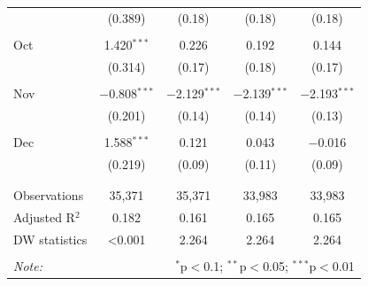 \documentclass[titlepage, 11pt]{article}
\begin{document}
\begin{table}[!htbp]
{\begin{tabular}{@{\extracolsep{5pt}}lcccc}
  & (0.389) & (0.18) & (0.18) & (0.18) \\ 
  & & & & \\ 
 Oct & 1.420$^{***}$ & 0.226 & 0.192  &0.144 \\ 
  & (0.314) & (0.17) & (0.18) & (0.17) \\ 
  & & & & \\ 
 Nov & $-$0.808$^{***}$ & $-$2.129$^{***}$ & $-$2.139$^{***}$ & $-$2.193$^{***}$ \\ 
  & (0.201) & (0.14) & (0.14) & (0.13) \\ 
  & & & & \\ 
 Dec & 1.588$^{***}$ & 0.121 & 0.043 & $-$0.016 \\ 
  & (0.219) & (0.09) & (0.11) & (0.09) \\ 
  & & & & \\ 

\hline \\[-1.8ex] 
Observations & 35,371 & 35,371 & 33,983 & 33,983 \\ 
Adjusted R$^{2}$ & 0.182 & 0.161 & 0.165 & 0.165 \\ 
DW statistics & <0.001 & 2.264 & 2.264 & 2.264 \\ 
\hline 
\hline \\[-1.8ex] 
\textit{Note:}  & \multicolumn{4}{r}{$^{*}$p$<$0.1; $^{**}$p$<$0.05; $^{***}$p$<$0.01} \\ 
\end{tabular} }
\end{table}
\end{document}
